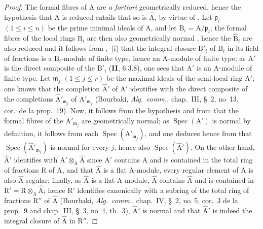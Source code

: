 \begin{proof}

The formal fibres of $\mathrm{A}$ are \emph{a fortiori} geometrically reduced, hence the hypothesis that $\mathrm{A}$ is reduced entails that so is $\widehat{\mathrm{A}}$, by virtue of . Let $\mathfrak{p}_i$ $(1\leqslant i\leqslant n)$ be the prime minimal ideals of $\mathrm{A}$, and let $\mathrm{B}_i=\mathrm{A}/\mathfrak{p}_i$; the formal fibres of the local rings $\mathrm{B}_i$ are then also geometrically normal , hence the $\widehat{\mathrm{B}}_i$ are also reduced and it follows from ,~(i) that the integral closure $\mathrm{B}'_i$ of $\mathrm{B}_i$ in its field of fractions is a $\mathrm{B}_i$-module of finite type, hence an $\mathrm{A}$-module of finite type; as $\mathrm{A}'$ is the direct composite of the $\mathrm{B}'_i$ (\textbf{II}, $6.3.8$), one sees that $\mathrm{A}'$ is an $\mathrm{A}$-module of finite type. Let $\mathfrak{m}_j$ $(1\leqslant j\leqslant r)$ be the maximal ideals of the semi-local ring $\mathrm{A}'$; one knows that the completion $\widehat{\mathrm{A}}'$ of $\mathrm{A}'$ identifies with the direct composite of the completions $\widehat{\mathrm{A}}'_{\mathfrak{m}_j}$ of $\mathrm{A}'_{\mathfrak{m}_j}$ (Bourbaki, \emph{Alg.\ comm.}, chap.~III, \S~2, no~13, cor.\ de la prop.~19). Now, it follows from the hypothesis and from  that the formal fibres of the $\mathrm{A}'_{\mathfrak{m}_j}$ are geometrically normal; as $\operatorname{Spec}(\mathrm{A}')$ is normal by definition, it follows from each $\operatorname{Spec}(\mathrm{A}'_{\mathfrak{m}_j})$, and one deduces hence from  that $\operatorname{Spec}(\widehat{\mathrm{A}}'_{\mathfrak{m}_j})$ is normal for every $j$, hence also $\operatorname{Spec}(\widehat{\mathrm{A}}')$. On the other hand, $\widehat{\mathrm{A}}'$ identifies with $\mathrm{A}'\otimes_\mathrm{A}\widehat{\mathrm{A}}$ since $\mathrm{A}'$ contains $\mathrm{A}$ and is contained in the total ring of fractions $\mathrm{R}$ of $\mathrm{A}$, and that $\widehat{\mathrm{A}}$ is a flat $\mathrm{A}$-module, every regular element of $\mathrm{A}$ is also $\widehat{\mathrm{A}}$-regular; finally, as $\widehat{\mathrm{A}}$ is a flat $\mathrm{A}$-module, $\widehat{\mathrm{A}}$ contains $\widehat{\mathrm{A}}$ and is contained in $\mathrm{R}'=\mathrm{R}\otimes_\mathrm{A}\widehat{\mathrm{A}}$; hence $\mathrm{R}'$ identifies canonically with a subring of the total ring of fractions $\mathrm{R}''$ of $\widehat{\mathrm{A}}$ (Bourbaki, \emph{Alg.\ comm.}, chap.~IV, \S~2, no~5, cor.~3 de la prop.~9 and chap.~III, \S~3, no~4, th.~3), $\widehat{\mathrm{A}}'$ is normal and that $\widehat{\mathrm{A}}'$ is indeed the integral closure of $\widehat{\mathrm{A}}$ in $\mathrm{R}''$.
\end{proof}

